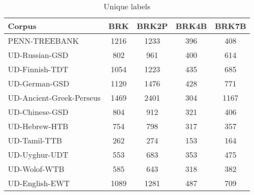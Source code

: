 \begin{table}[h]
    \centering
    \caption{Unique labels}
    \label{tab:unique}
    \begin{tabular}{lcccc}
        \hline
        Corpus                          &  BRK & BRK2P & BRK4B & BRK7B \\
        \hline
        PENN-TREEBANK                   & 1216 &  1233 &   396 &   408 \\
        UD-Russian-GSD                  &  802 &   961 &   400 &   614 \\
        UD-Finnish-TDT                  & 1054 &  1223 &   435 &   685 \\
        UD-German-GSD                   & 1120 &  1476 &   428 &   771 \\
        UD-Ancient-Greek-Perseus        & 1469 &  2401 &   304 &  1167 \\
        UD-Chinese-GSD                  &  804 &   912 &   321 &   406 \\
        UD-Hebrew-HTB                   &  754 &   798 &   317 &   357 \\
        UD-Tamil-TTB                    &  262 &   274 &   153 &   164 \\
        UD-Uyghur-UDT                   &  553 &   683 &   353 &   475 \\
        UD-Wolof-WTB                    &  585 &   643 &   318 &   382 \\
        UD-English-EWT                  & 1089 &  1281 &   487 &   709 \\
        \hline
    \end{tabular}
\end{table}


